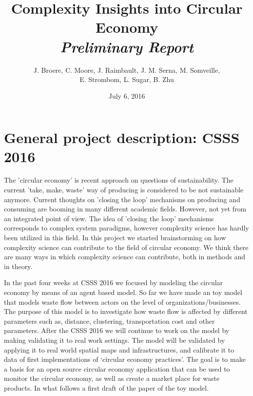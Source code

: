\documentclass{article}
\begin{document}
\title{Complexity Insights into Circular Economy\\
\textit{Preliminary Report}
}

\author{J. Broere, C. Moore, J. Raimbault, J. M. Serna, M. Somveille,\\
E. Strombom, L. Sugar, B. Zhu}

\date{July 6, 2016}

\maketitle

\section*{General project description: CSSS 2016}
The 'circular economy' is recent approach on questions of sustainability. The current 'take, make, waste' way of producing is considered to be not sustainable anymore. Current thoughts on 'closing the loop' mechanisms on producing and consuming are booming in many different academic fields. However, not yet from an integrated point of view. The idea of 'closing the loop' mechanisms corresponds to complex system paradigms, however complexity science has hardly been utilized in this field. In this project we started brainstorming on how complexity science can contribute to the field of circular economy. We think there are many ways in which complexity science can contribute, both in methods and in theory. 

In the past four weeks at CSSS 2016 we focused by modeling the circular economy by means of an agent based model. So far we have made an toy model that models waste flow between actors on the level of organizations/businesses. The purpose of this model is to investigate how waste flow is affected by different parameters such as, distance, clustering, transportation cost and other parameters. After the CSSS 2016 we will continue to work on the model by making validating it to real work settings. The model will be validated by applying it to real world spatial maps and infrastructures, and calibrate it to data of first implementations of `circular economy practices'. The goal is to make a basis for an open source circular economy application that can be used to monitor the circular economy, as well as create a market place for waste products. In what follows a first draft of the paper of the toy model.



\end{document}
